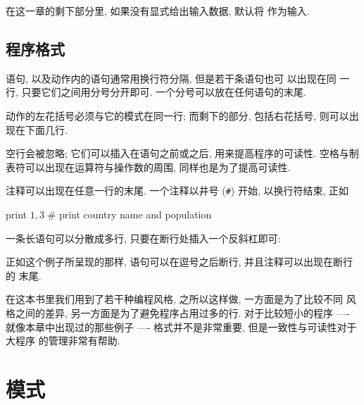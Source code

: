 在这一章的剩下部分里, 如果没有显式给出输入数据, 默认将 
作为输入.

\subsection*{程序格式}
\label{subsec:program_format}

\patact 语句, 以及动作内的语句通常用换行符分隔, 但是若干条语句也可
以出现在同
一行, 只要它们之间用分号分开即可. 一个分号可以放在任何语句的末尾.

动作的左花括号必须与它的模式在同一行; 而剩下的部分, 包括右花括号, 则可以出
现在下面几行.

空行会被忽略; 它们可以插入在语句之前或之后, 用来提高程序的可读性. 空格与制
表符可以出现在运算符与操作数的周围, 同样也是为了提高可读性.

注释可以出现在任意一行的末尾. 一个注释以井号 (\verb'#') 开始,
以换行符结束, 正如
\begin{awkcode}
    { print $1, $3 }    # print country name and population
\end{awkcode}

一条长语句可以分散成多行, 只要在断行处插入一个反斜杠即可:
正如这个例子所呈现的那样, 语句可以在逗号之后断行, 并且注释可以出现在断行的
末尾.

在这本书里我们用到了若干种编程风格, 之所以这样做, 一方面是为了比较不同
风格之间的差异, 另一方面是为了避免程序占用过多的行. 对于比较短小的程序
---- 就像本章中出现过的那些例子 ----
格式并不是非常重要, 但是一致性与可读性对于大程序
的管理非常有帮助.

\section{模式}
\label{sec:patterns}

